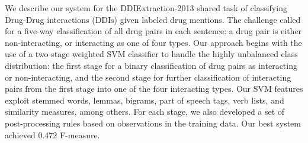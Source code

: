 We describe our system for the DDIExtraction-2013 shared task of classifying Drug-Drug interactions (DDIs) given labeled drug mentions. The challenge called
 for a five-way classification of all drug pairs in each sentence: a drug pair
 is either non-interacting, or interacting as one of four types. Our approach
 begins with the use of a two-stage weighted SVM classifier to handle the highly
 unbalanced class distribution: the first stage for a binary classification of
 drug pairs as interacting or non-interacting, and the second stage for further
 classification of interacting pairs from the first stage into one of the four
 interacting types. Our SVM features exploit stemmed words, lemmas, bigrams,
 part of speech tags, verb lists, and similarity measures, among others. For
 each stage, we also developed a set of post-processing rules based on
 observations in the training data. Our best system achieved 0.472 F-measure.

